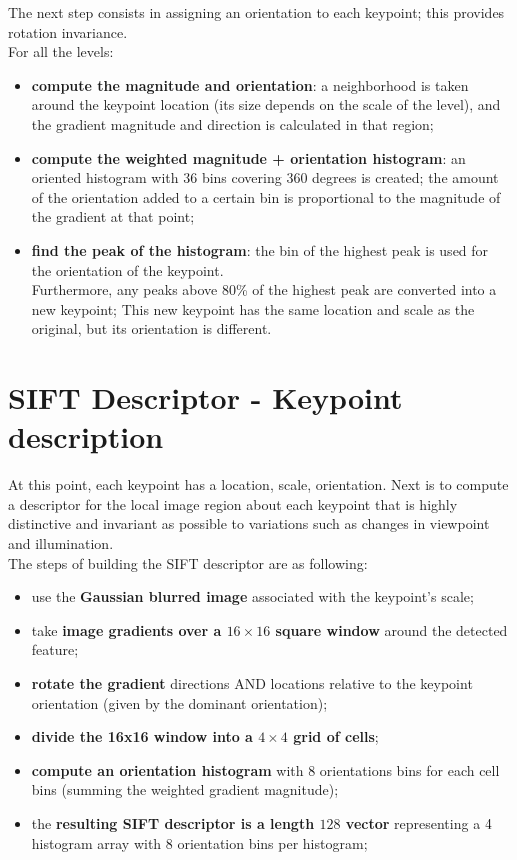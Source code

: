 \documentclass{article}
\begin{document}
The next step consists in assigning an orientation to each keypoint; this provides rotation invariance. \\

For all the levels:
\begin{itemize}
    \item \textbf{compute the magnitude and orientation}: a neighborhood is taken around the keypoint location (its size depends on the scale of the level), and the gradient magnitude and direction is calculated in that region;
    \item \textbf{compute the weighted magnitude + orientation histogram}: an oriented histogram with $36$ bins covering $360$ degrees is created; the amount of the orientation added to a certain bin is proportional to the magnitude of the gradient at that point;
    \item \textbf{find the peak of the histogram}: the bin of the highest peak is used for the orientation of the keypoint. \\
    
    Furthermore, any peaks above 80\% of the highest peak are converted into a new keypoint; This new keypoint has the same location and scale as the original, but its orientation is different.
\end{itemize}

\section*{SIFT Descriptor - Keypoint description}

At this point, each keypoint has a location, scale, orientation. Next is to compute a descriptor for the local image region about each keypoint that is highly distinctive and invariant as possible to variations such as changes in viewpoint and illumination. \\

The steps of building the SIFT descriptor are as following:

\begin{itemize}
    \item use the \textbf{Gaussian blurred image} associated with the keypoint's scale;
    \item take \textbf{image gradients over a $16\times16$ square window} around the detected feature;
    \item \textbf{rotate the gradient} directions AND locations relative to the keypoint orientation (given by the dominant orientation);
    \item \textbf{divide the 16x16 window into a $4\times4$ grid of cells};
    \item \textbf{compute an orientation histogram} with $8$ orientations bins for each cell bins (summing the weighted gradient magnitude);
    \item the \textbf{resulting SIFT descriptor is a length $128$ vector} representing a $4\time4$ histogram array with $8$ orientation bins per histogram;
\end{itemize}
\end{document}
